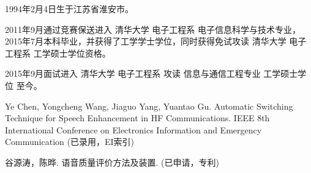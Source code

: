 \begin{resume}


1994年2月4日生于江苏省淮安市。

2011年9月通过竞赛保送进入 清华大学 电子工程系 电子信息科学与技术专业，2015年7月本科毕业，并获得了工学学士学位，同时获得免试攻读 清华大学 电子工程系 工学硕士学位资格。

2015年9月面试进入 清华大学 电子工程系 攻读 信息与通信工程专业 工学硕士学位 至今。


\begin{publications}
\item Ye Chen, Yongcheng Wang, Jiaguo Yang, Yuantao Gu. Automatic Switching Technique for Speech Enhancement in HF Communications. IEEE 8th International Conference on Electronics Information and Emergency Communication (已录用，EI索引)
\item 谷源涛，陈晔. 语音质量评价方法及装置. (已申请，专利)
\end{publications}

\end{resume}
